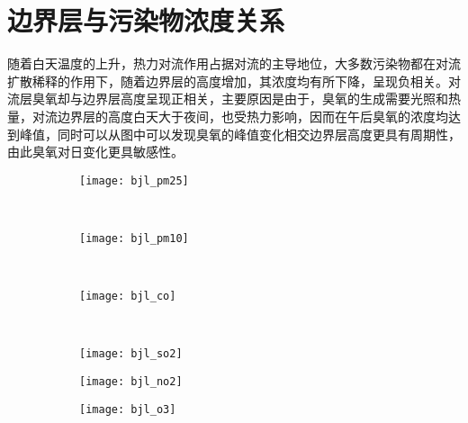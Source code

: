 \section{边界层与污染物浓度关系}

随着白天温度的上升，热力对流作用占据对流的主导地位，大多数污染物都在对流扩散稀释的作用下，随着边界层的高度增加，其浓度均有所下降，呈现负相关。对流层臭氧却与边界层高度呈现正相关，主要原因是由于，臭氧的生成需要光照和热量，对流边界层的高度白天大于夜间，也受热力影响，因而在午后臭氧的浓度均达到峰值，同时可以从图中可以发现臭氧的峰值变化相交边界层高度更具有周期性，由此臭氧对日变化更具敏感性。

\begin{figure}[!htbp]
    \centering
    \begin{subfigure}[b]{0.35\textwidth}
      \texttt{[image: bjl\_pm25]}
      \caption{}
      \label{fig:bjl_pm25}
    \end{subfigure}%
    ~%
    \begin{subfigure}[b]{0.35\textwidth}
      \texttt{[image: bjl\_pm10]}
      \caption{}
			\label{fig:bjl_pm10}
    \end{subfigure}
    \\%
    \begin{subfigure}[b]{0.35\textwidth}
      \texttt{[image: bjl\_co]}
      \caption{}
			\label{fig:bjl_co}
    \end{subfigure}%
    ~%
    \begin{subfigure}[b]{0.35\textwidth}
      \texttt{[image: bjl\_so2]}
      \caption{}
			\label{fig:bjl_so2}
    \end{subfigure}
    \begin{subfigure}[b]{0.35\textwidth}
      \texttt{[image: bjl\_no2]}
      \caption{}
			\label{fig:bjl_no2}
    \end{subfigure}
    \begin{subfigure}[b]{0.35\textwidth}
      \texttt{[image: bjl\_o3]}
      \caption{}
			\label{fig:bjl_o3}
    \end{subfigure}
    \label{fig:oaspl}
\end{figure}



